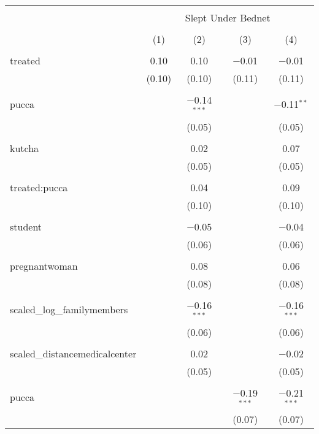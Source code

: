 
\begin{table}[!htbp] \centering 
  \caption{} 
  \label{} 
\begin{tabular}{@{\extracolsep{5pt}}lcccc} 
\\[-1.8ex]\hline 
\hline \\[-1.8ex] 
 & \multicolumn{4}{c}{Slept Under Bednet} \\ 
\cline{2-5} 
\\[-1.8ex] & (1) & (2) & (3) & (4)\\ 
\hline \\[-1.8ex] 
 treated & 0.10 & 0.10 & $-$0.01 & $-$0.01 \\ 
  & (0.10) & (0.10) & (0.11) & (0.11) \\ 
  & & & & \\ 
 pucca &  & $-$0.14$^{***}$ &  & $-$0.11$^{**}$ \\ 
  &  & (0.05) &  & (0.05) \\ 
  & & & & \\ 
 kutcha &  & 0.02 &  & 0.07 \\ 
  &  & (0.05) &  & (0.05) \\ 
  & & & & \\ 
 treated:pucca &  & 0.04 &  & 0.09 \\ 
  &  & (0.10) &  & (0.10) \\ 
  & & & & \\ 
 student &  & $-$0.05 &  & $-$0.04 \\ 
  &  & (0.06) &  & (0.06) \\ 
  & & & & \\ 
 pregnantwoman &  & 0.08 &  & 0.06 \\ 
  &  & (0.08) &  & (0.08) \\ 
  & & & & \\ 
 scaled\_log\_familymembers &  & $-$0.16$^{***}$ &  & $-$0.16$^{***}$ \\ 
  &  & (0.06) &  & (0.06) \\ 
  & & & & \\ 
 scaled\_distancemedicalcenter &  & 0.02 &  & $-$0.02 \\ 
  &  & (0.05) &  & (0.05) \\ 
  & & & & \\ 
 pucca &  &  & $-$0.19$^{***}$ & $-$0.21$^{***}$ \\ 
  &  &  & (0.07) & (0.07) \\ 

\end{tabular}
\end{table}
